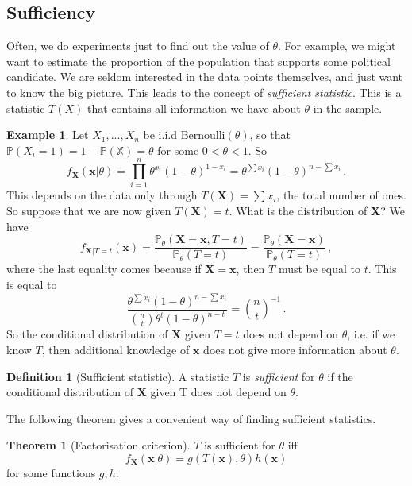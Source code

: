 \documentclass[a4paper,11pt]{article}
\theoremstyle{definition}
\newtheorem*{defn}{Definition}
\newtheorem*{ex}{Example}
\newtheorem*{thm}{Theorem}
\numberwithin{equation}{section}
\begin{document}
\subsection{Sufficiency}
Often, we do experiments just to find out the value of $\theta$. For example, we might want to estimate the proportion of the population that supports some political candidate. We are seldom interested in the data points themselves, and just want to know the big picture. This leads to the concept of \emph{sufficient statistic}. This is a statistic $T(X)$ that contains all information we have about $\theta$ in the sample.

\begin{ex}
Let $X_1,...,X_n$ be i.i.d $\text{Bernoulli}(\theta)$, so that $\mathbb{P}(X_i=1)=1-\mathbb{P(X)}=\theta$ for some $0<\theta<1$. So
\[
f_\mathbf{X}(\mathbf{x}|\theta)=\prod_{i=1}^n\theta^{x_i}(1-\theta)^{1-x_i}=\theta^{\sum x_i}(1-\theta)^{n-\sum x_i}\,.
\]
This depends on the data only through $T(\mathbf{X})=\sum x_i$, the total number of ones. So suppose that we are now given $T(\mathbf{X})=t$. What is the distribution of $\mathbf{X}$? We have
\[
f_{\mathbf{X}|T=t}(\mathbf{x})=\frac{\mathbb{P}_\theta(\mathbf{X}=\mathbf{x}, T=t)}{\mathbb{P}_\theta(T=t)}=\frac{\mathbb{P}_\theta(\mathbf{X}=\mathbf{x})}{\mathbb{P}_\theta(T=t)}\,,
\]
where the last equality comes because if $\mathbf{X}=\mathbf{x}$, then $T$ must be equal to $t$. This is equal to
\[
\frac{\theta^{\sum x_i}(1-\theta)^{n-\sum x_i}}{\binom{n}{t}\theta^t(1-\theta)^{n-t}}=\binom{n}{t}^{-1}\,.
\]
So the conditional distribution of $\mathbf{X}$ given $T=t$ does not depend on $\theta$, i.e. if we know $T$, then additional knowledge of $\mathbf{x}$ does not give more information about $\theta$.
\end{ex}

\begin{defn}[Sufficient statistic]
A statistic $T$ is \emph{sufficient} for $\theta$ if the conditional distribution of $\mathbf{X}$ given T does not depend on $\theta$.
\end{defn}

The following theorem gives a convenient way of finding sufficient statistics.

\begin{thm}[Factorisation criterion]
$T$ is sufficient for $\theta$ iff
\[
f_\mathbf{X}(\mathbf{x}|\theta)=g(T(\mathbf{x}),\theta)h(\mathbf{x})
\]
for some functions $g,h$.
\end{thm}
\end{document}
